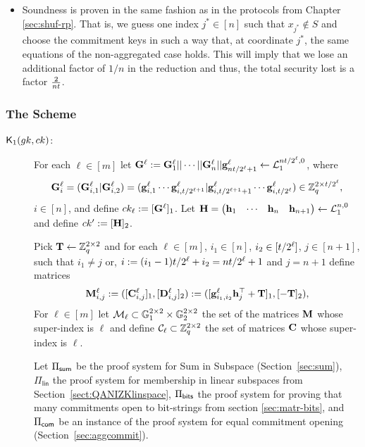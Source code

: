 \begin{itemize}
\item Soundness is proven in the same fashion as in the protocols from Chapter \ref{sec:shuf-rp}. That is, we guess one index \(j^*\in[n]\) such that \(x_{j^*}\notin S\) and choose the commitment keys in such a way that, at coordinate \(j^*\), the same equations of the non-aggregated case holds. This will imply that we lose an additional factor of \(1/n\) in the reduction and thus, the total security lost is a factor \(\frac{2}{nt }\).
\end{itemize}
\subsubsection{The Scheme}

\begin{description}

\item[{\(\mathsf{K}_1({gk}, ck)\)}:]
For each \(\ell\in [m]\) let \(\mathbf{{G}}^\ell:=\mathbf{{G}}^\ell_1||\cdots||\mathbf{{G}}^\ell_n||\mathbf{g}^\ell_{nt /2^\ell+1}\gets\mathcal{L}_1^{nt /2^\ell,0}\), where
\[\mathbf{{G}}^\ell_i=
(\mathbf{{G}}^\ell_{i,1}|\mathbf{{G}}^\ell_{i,2})
=
(\mathbf{g}^\ell_{i,1}\cdots\mathbf{g}^\ell_{i,t /2^{\ell+1}}|\mathbf{g}^\ell_{i,t /2^{\ell+1}+1}\cdots\mathbf{g}^\ell_{i,t /2^\ell})
\in\mathbb{Z}_q^{2\times t /2^\ell},\] \(i\in  [n]\), and define \(ck_\ell:=[\mathbf{{G}}^\ell]_1\).
Let \(\mathbf{{H}}=\begin{pmatrix}\mathbf{h}_1&\cdots&\mathbf{h}_n&\mathbf{h}_{n+1}\end{pmatrix}\gets\mathcal{L}_1^{n,0}\) and define \(ck':=[\mathbf{{H}}]_2\). 

Pick \(\mathbf{{T}}\gets\mathbb{Z}_q^{2\times 2}\) and for each \(\ell\in[m]\), \( i_1\in [n]\), \(i_2 \in [t /2^\ell]\), \(j\in  [n+1]\), such that \(i_1\neq j\) or, \(i:=(i_1-1)t /2^\ell+i_2=nt /2^\ell+1\) and \(j=n+1\) define matrices
\[\mathbf{{M}}^\ell_{i,j}:=([\mathbf{{C}}_{i,j}^\ell]_1,[\mathbf{{D}}_{i,j}^\ell]_2):=([\mathbf{g}_{i_1,i_2}^\ell\mathbf{h}_j^{\top}+\mathbf{{T}}]_1,[-\mathbf{{T}}]_2),\]
For \(\ell\in [m]\) let \(\mathcal{M}_\ell\subset\mathbb{G}_1^{2\times 2}\times\mathbb{G}_2^{2\times 2}\) the set of the matrices \(\mathbf{{M}}\) whose super-index is \(\ell\) and define \(\mathcal{C}_\ell\subset\mathbb{Z}_q^{2\times 2}\) the set of matrices \(\mathbf{{C}}\) whose super-index is \(\ell\).

Let \(\Pi_{\mathsf{sum}}\) be the proof system for Sum in Subspace 
(Section~\ref{sec:sum}), \(\Pi_\mathsf{lin}\) the proof system for membership in linear subspaces from Section~\ref{sect:QANIZKlinspace}, \(\Pi_{\mathsf{bits}}\) the proof system for proving that many commitments open to bit-strings from section \ref{sec:matr-bits}, and \(\Pi_{\mathsf{com}}\)
be an instance of the proof system for equal commitment opening (Section~\ref{sec:aggcommit}).


\end{description}
